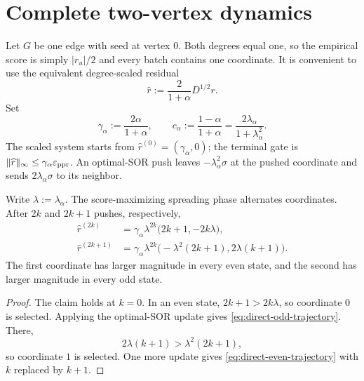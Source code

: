 \section{Complete two-vertex dynamics}
\label{sec:direct-two-vertex}

Let $G$ be one edge with seed at vertex $0$. Both degrees equal one, so the
empirical score is simply $|r_u|/2$ and every batch contains one coordinate.
It is convenient to use the equivalent degree-scaled residual
\begin{equation}
 \widehat r:=\frac{2}{1+\alpha}D^{1/2}r.
 \label{eq:direct-scaled-residual}
\end{equation}
Set
\begin{equation}
 \gamma_\alpha:=\frac{2\alpha}{1+\alpha},
 \qquad
 c_\alpha:=\frac{1-\alpha}{1+\alpha}
 =\frac{2\lambda_\alpha}{1+\lambda_\alpha^2}.
 \label{eq:direct-scaled-parameters}
\end{equation}
The scaled system starts from
$\widehat r^{(0)}=(\gamma_\alpha,0)$; the terminal gate is
$\|\widehat r\|_\infty\leq\gamma_\alpha\varepsilon_{\mathrm{ppr}}$. An optimal-SOR push leaves
$-\lambda_\alpha^2\sigma$ at the pushed coordinate and sends
$2\lambda_\alpha\sigma$ to its neighbor.

\begin{lemma}
\label{lem:direct-edge-trajectory}
Write $\lambda:=\lambda_\alpha$. The score-maximizing spreading phase
alternates coordinates. After $2k$ and $2k+1$ pushes, respectively,
\begin{align}
 \widehat r^{(2k)}
 &=\gamma_\alpha\lambda^{2k}
   \bigl(2k+1,-2k\lambda\bigr),
 \label{eq:direct-even-trajectory}\\
 \widehat r^{(2k+1)}
 &=\gamma_\alpha\lambda^{2k}
   \bigl(-\lambda^2(2k+1),2\lambda(k+1)\bigr).
 \label{eq:direct-odd-trajectory}
\end{align}
The first coordinate has larger magnitude in every even state, and the
second has larger magnitude in every odd state.
\end{lemma}

\begin{proof}
The claim holds at $k=0$. In an even state,
$2k+1>2k\lambda$, so coordinate $0$ is selected. Applying the optimal-SOR
update gives \cref{eq:direct-odd-trajectory}. There,
\begin{equation*}
 2\lambda(k+1)>\lambda^2(2k+1),
\end{equation*}
so coordinate $1$ is selected. One more update gives
\cref{eq:direct-even-trajectory} with $k$ replaced by $k+1$.
\end{proof}

